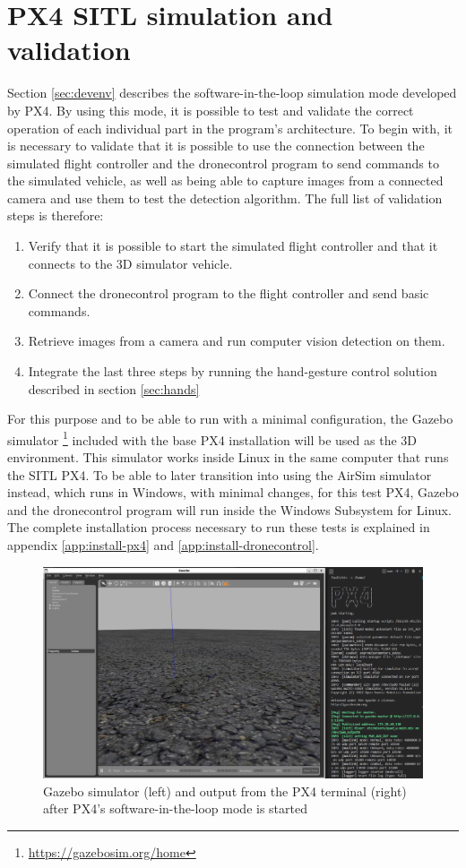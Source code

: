 \section{PX4 SITL simulation and validation}
\label{sec:test-2-sitl}

Section \ref{sec:devenv} describes the software-in-the-loop simulation mode developed by PX4.
By using this mode, it is possible to test and validate the correct operation of each individual part in the program's architecture.
To begin with, it is necessary to validate that it is possible to use the connection between the simulated flight controller and the dronecontrol program to send commands to the simulated vehicle, as well as being able to capture images from a connected camera and use them to test the detection algorithm.
The full list of validation steps is therefore:
\begin{enumerate}
    \item Verify that it is possible to start the simulated flight controller and that it connects to the 3D simulator vehicle.
    \item Connect the dronecontrol program to the flight controller and send basic commands.
    \item Retrieve images from a camera and run computer vision detection on them.
    \item Integrate the last three steps by running the hand-gesture control solution described in section \ref{sec:hands}
\end{enumerate}

For this purpose and to be able to run with a minimal configuration, the Gazebo simulator \footnote{\url{https://gazebosim.org/home}} included with the base PX4 installation will be used as the 3D environment.
This simulator works inside Linux in the same computer that runs the SITL PX4.
To be able to later transition into using the AirSim simulator instead, which runs in Windows, with minimal changes, for this test PX4, Gazebo and the dronecontrol program will run inside the Windows Subsystem for Linux.
The complete installation process necessary to run these tests is explained in appendix \ref{app:install-px4} and \ref{app:install-dronecontrol}.

\begin{figure}
  \centering
  \includegraphics[width=.8\textwidth, keepaspectratio]{img/gazebo.png}
  \caption{Gazebo simulator (left) and output from the PX4 terminal (right) after PX4's software-in-the-loop mode is started}\label{fig:gazebo}
\end{figure}

